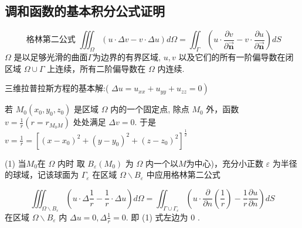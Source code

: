 \subsection{调和函数的基本积分公式证明}
\begin{questions}
\begin{solution}
$$
\text { 格林第二公式 } \iiint_{\Omega}(u \cdot \Delta v-v \cdot \Delta u) d \Omega=\iint_{\Gamma}\left(u \cdot \frac{\partial v}{\partial \vec{\boldsymbol n}}-v \cdot \frac{\partial u}{\partial \vec{\boldsymbol n}}\right) dS
$$
$ \Omega $ 是以足够光滑的曲面$\Gamma $为边界的有界区域,
$ u , v $ 以及它们的所有一阶偏导数在闭区域 $ \Omega \cup  \Gamma $ 上连续，所有二阶偏导数在 $ \Omega $ 内连续.

三维拉普拉斯方程的基本解:( $ \left.\Delta u=u_{x x}+u_{y y}+u_{z z}=0\right) $

若 $ M_{0}\left(x_{0}, y_{0}, z_{0}\right) $ 是区域 $ \Omega $ 内的一个固定点, 除点 $ M_{0} $ 外，函数 $ v=\frac{1}{r}\left(r=r_{M_{0} M}\right) $ 处处满足 $ \Delta v=0 $.
于是 $ v=\frac{1}{r}=\left[\left(x-x_{0}\right)^{2}+\left(y-y_{0}\right)^{2}+\left(z-z_{0}\right)^{2}\right]^{\frac{1}{2}} $

 (1) 当$M_0$在 $ \Omega $ 内时
取 $ B_{\varepsilon}\left(M_{0}\right) $ 为 $ \Omega $ 内一个以$M$为中心)，充分小正数 $ \varepsilon $ 为半径的球域，记该球面为 $ \Gamma_{\varepsilon} $ 在区域 $ \Omega \backslash B_{\varepsilon} $ 中应用格林第二公式

\begin{equation}
\iiint_{\Omega \backslash B_{\varepsilon}}\left(u \cdot \Delta \frac{1}{r}-\frac{1}{r} \cdot \Delta u\right) d \Omega=\iint_{\Gamma \cup \Gamma_{\varepsilon}}\left(u \cdot \frac{\partial}{\partial n}\left(\frac{1}{r}\right)-\frac{1}{r} \frac{\partial u}{\partial n}\right) d S
\end{equation}
在区域 $ \Omega \backslash B_{\varepsilon} $ 内 $ \Delta u=0 , \Delta \frac{1}{r}=0 $. 即 (1) 式左边为 0 .


\end{solution}
\end{questions}
